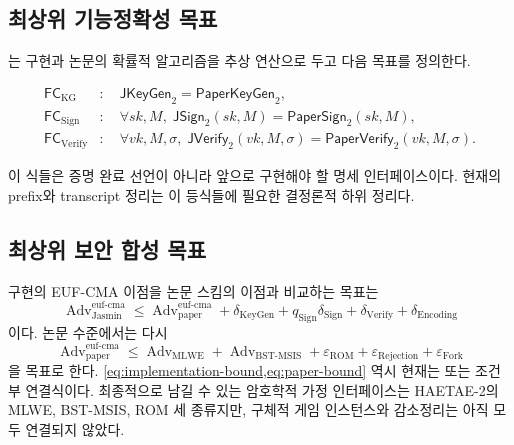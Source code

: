 \subsection{최상위 기능정확성 목표}

는 구현과 논문의 확률적 알고리즘을
추상 연산으로 두고 다음 목표를 정의한다.

\begin{align*}
  \mathsf{FC}_{\mathrm{KG}}
    &:\quad \mathsf{JKeyGen}_2=\mathsf{PaperKeyGen}_2,\\
  \mathsf{FC}_{\mathrm{Sign}}
    &:\quad \forall sk,M,\;
       \mathsf{JSign}_2(sk,M)=\mathsf{PaperSign}_2(sk,M),\\
  \mathsf{FC}_{\mathrm{Verify}}
    &:\quad \forall vk,M,\sigma,\;
       \mathsf{JVerify}_2(vk,M,\sigma)
       =\mathsf{PaperVerify}_2(vk,M,\sigma).
\end{align*}

이 식들은 증명 완료 선언이 아니라 앞으로 구현해야 할 명세 인터페이스이다.
현재의 prefix와 transcript 정리는 이 등식들에 필요한 결정론적 하위 정리다.

\subsection{최상위 보안 합성 목표}

구현의 EUF-CMA 이점을 논문 스킴의 이점과 비교하는 목표는
\begin{equation}
\label{eq:implementation-bound}
  \operatorname{Adv}^{\mathrm{euf\mbox{-}cma}}_{\mathrm{Jasmin}}
  \le
  \operatorname{Adv}^{\mathrm{euf\mbox{-}cma}}_{\mathrm{paper}}
  +\delta_{\mathrm{KeyGen}}
  +q_{\mathrm{Sign}}\delta_{\mathrm{Sign}}
  +\delta_{\mathrm{Verify}}
  +\delta_{\mathrm{Encoding}}
\end{equation}
이다. 논문 수준에서는 다시
\begin{equation}
\label{eq:paper-bound}
  \operatorname{Adv}^{\mathrm{euf\mbox{-}cma}}_{\mathrm{paper}}
  \le
  \operatorname{Adv}_{\mathrm{MLWE}}
  +\operatorname{Adv}_{\mathrm{BST\mbox{-}MSIS}}
  +\varepsilon_{\mathrm{ROM}}
  +\varepsilon_{\mathrm{Rejection}}
  +\varepsilon_{\mathrm{Fork}}
\end{equation}
을 목표로 한다. \cref{eq:implementation-bound,eq:paper-bound} 역시 현재는
\statusspecified 또는 조건부 연결식이다. 최종적으로 남길 수 있는 암호학적
가정 인터페이스는 HAETAE-2의 MLWE, BST-MSIS, ROM 세 종류지만, 구체적 게임
인스턴스와 감소정리는 아직 모두 연결되지 않았다.
